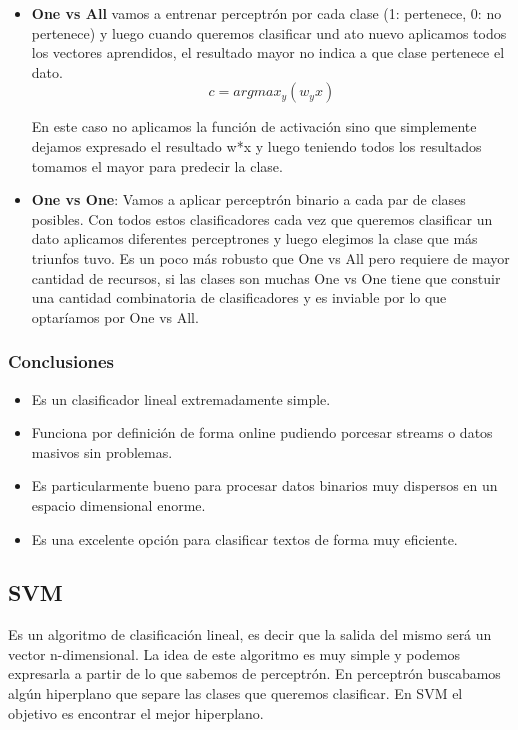 \documentclass[titlepage,a4paper]{article}
\begin{document}
\begin{itemize}
\item \textbf{One vs All} vamos a entrenar perceptrón por cada clase (1: pertenece, 0: no pertenece) y luego cuando queremos clasificar und ato nuevo aplicamos todos los vectores aprendidos, el resultado mayor no indica a que clase pertenece el dato. $$ c = argmax_y (w_y x) $$

En este caso no aplicamos la función de activación sino que simplemente dejamos expresado el resultado w*x y luego teniendo todos los resultados tomamos el mayor para predecir la clase. 

\item \textbf{One vs One}: Vamos a aplicar perceptrón binario a cada par de clases posibles. Con todos estos clasificadores cada vez que queremos clasificar un dato aplicamos diferentes perceptrones y luego elegimos la clase que más triunfos tuvo. Es un poco más robusto que One vs All pero requiere de mayor cantidad de recursos, si las clases son muchas One vs One tiene que constuir una cantidad combinatoria de clasificadores y es inviable por lo que optaríamos por One vs All. 
\end{itemize}

\subsubsection*{Conclusiones}
\begin{itemize}
\item Es un clasificador lineal extremadamente simple.
\item Funciona por definición de forma online pudiendo porcesar streams o datos masivos sin problemas. 
\item Es particularmente bueno para procesar datos binarios muy dispersos en un espacio dimensional enorme. 
\item Es una excelente opción para clasificar textos de forma muy eficiente.  
\end{itemize}


\subsection*{SVM}
Es un algoritmo de clasificación lineal, es decir que la salida del mismo será un vector n-dimensional. La idea de este algoritmo es muy simple y podemos expresarla a partir de lo que sabemos de perceptrón. En perceptrón buscabamos algún hiperplano que separe las clases que queremos clasificar. En SVM el objetivo es encontrar el mejor hiperplano. \\
\end{document}
